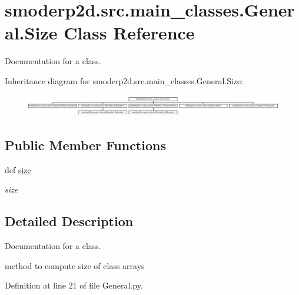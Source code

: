 \hypertarget{classsmoderp2d_1_1src_1_1main__classes_1_1General_1_1Size}{\section{smoderp2d.\-src.\-main\-\_\-classes.\-General.\-Size Class Reference}
\label{classsmoderp2d_1_1src_1_1main__classes_1_1General_1_1Size}
}


Documentation for a class.  


Inheritance diagram for smoderp2d.\-src.\-main\-\_\-classes.\-General.\-Size\-:\begin{figure}[H]
\begin{center}
\leavevmode
\includegraphics[height=0.965517cm]{d6/de2/classsmoderp2d_1_1src_1_1main__classes_1_1General_1_1Size}
\end{center}
\end{figure}
\subsection*{Public Member Functions}
\begin{DoxyCompactItemize}
\item 
def \hyperlink{classsmoderp2d_1_1src_1_1main__classes_1_1General_1_1Size_a8546bcd644a0f79337648b9b1badaf4a}{size}
\begin{DoxyCompactList}\small\item\em size \end{DoxyCompactList}\end{DoxyCompactItemize}


\subsection{Detailed Description}
Documentation for a class. 

method to compute size of class arrays 

Definition at line 21 of file General.\-py.



